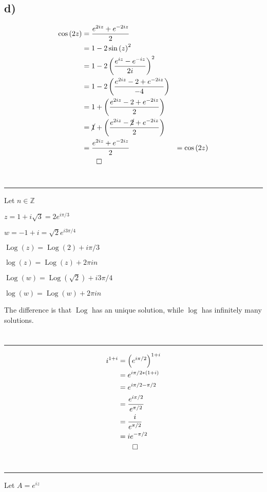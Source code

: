 \documentclass[12pt]{article}
\begin{document}
\subsection{d)}
\begin{align*}
	\cos{(2z)} &= \dfrac{e^{2iz} + e^{-2iz}}{2}\\
	&= 1 - 2\sin{(z)}^2\\
	&= 1 - 2 \left(\dfrac{e^{iz} - e^{-iz}}{2i}\right)^2\\
	&= 1 - 2 \left(\dfrac{e^{2iz} - 2 + e^{-2iz}}{-4}\right)\\
	&= 1 + \left(\dfrac{e^{2iz} - 2 + e^{-2iz}}{2}\right)\\
	&= \cancel{1} + \left(\dfrac{e^{2iz} - \cancel{2} + e^{-2iz}}{2}\right)\\
	&= \dfrac{e^{2iz} + e^{-2iz}}{2}
	&= \cos{(2z)}\\
	&\qed
\end{align*}
\newpage
\section{}\hrule
Let $n\in\mathbb{Z}$

$z = 1 + i\sqrt{3} = 2e^{i\pi/3}$

$w = -1 + i = \sqrt{2}e^{i3\pi/4}$

$\operatorname{Log}{(z)} = \operatorname{Log}{(2)} + i\pi/3$

$\log{(z)} = \operatorname{Log}{(z)} + 2\pi i n$

$\operatorname{Log}{(w)} = \operatorname{Log}{(\sqrt{2})} + i3\pi/4$

$\log{(w)} = \operatorname{Log}{(w)} + 2\pi i n$

The difference is that $\operatorname{Log}$ has an unique solution, while $\log$ has infinitely many solutions.
\newpage
\section{}\hrule
\begin{align*}
	i^{1+i} &= \left(e^{i\pi/2}\right)^{1+i}\\
	&= e^{i\pi/2 * (1+i)}\\
	&= e^{i\pi/2 - \pi/2}\\
	&= \dfrac{e^{i\pi/2}}{e^{\pi/2}}\\
	&= \dfrac{i}{e^{\pi/2}}\\
	&= ie^{-\pi/2}\\
	&\qed
\end{align*}
\newpage
\section{}\hrule
Let $ A = e^{iz} $
\end{document}
